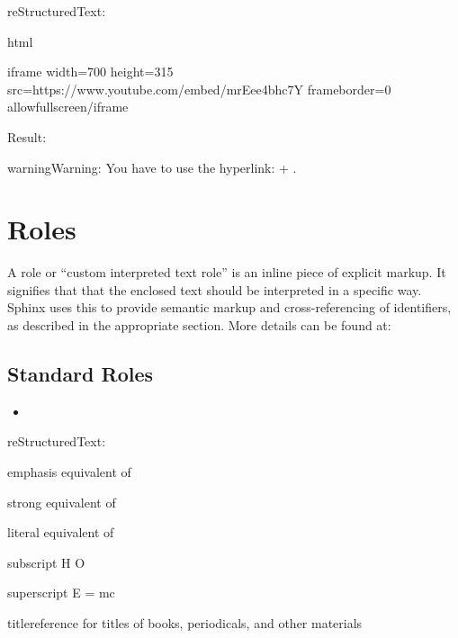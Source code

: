 \documentclass[letterpaper,11pt,english]{sphinxmanual}
\begin{document}
reStructuredText:

\begin{sphinxVerbatim}[commandchars=\\\{\}]
  html

    \PYGZlt{}iframe width=\PYGZdq{}700\PYGZdq{} height=\PYGZdq{}315\PYGZdq{}
    src=\PYGZdq{}https://www.youtube.com/embed/mrEee4bhc7Y\PYGZdq{}
    frameborder=\PYGZdq{}0\PYGZdq{} allowfullscreen\PYGZgt{}\PYGZlt{}/iframe\PYGZgt{}
\end{sphinxVerbatim}

Result:



\begin{sphinxadmonition}{warning}{Warning:}
You have to use the hyperlink:  + .
\end{sphinxadmonition}


\section{Roles}
\label{\detokenize{rtxt:roles}}
A role or “custom interpreted text role” is an inline piece of explicit markup. It signifies that that the enclosed text should be interpreted in a specific way. Sphinx uses this to provide semantic markup and cross-referencing of identifiers, as described in the appropriate section. More details can be found at: 


\subsection{Standard Roles}
\label{\detokenize{rtxt:standard-roles}}\begin{itemize}
\item {} 

\end{itemize}

reStructuredText:

\begin{sphinxVerbatim}[commandchars=\\\{\}]
 emphasis \textendash{} equivalent of 

 strong \textendash{} equivalent of 

 literal \textendash{} equivalent of 

 subscript \textendash{} H\PYGZbs{} \PYGZbs{} O

 superscript \textendash{} E = mc\PYGZbs{} 

 title\PYGZhy{}reference \textendash{} for titles of books, periodicals, and other materials
\end{sphinxVerbatim}
\end{document}
